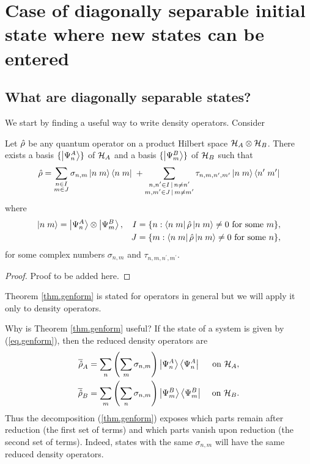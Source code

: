 \section{Case of diagonally separable initial state where new states can be entered}\label{sec.separablestate}

\subsection{What are diagonally separable states?}

We start by finding a useful way to write density operators. Consider
\begin{theorem}\label{thm.genform}
Let \(\hat{\rho}\) be any quantum operator on a product Hilbert space \(\mathcal{H}_A\otimes\mathcal{H}_B\). There exists a basis \(\{\left|\Psi_n^A\right\rangle\}\) of \(\mathcal{H}_A\) and a basis \(\{\left|\Psi_m^B\right\rangle\}\) of \(\mathcal{H}_B\) such that
\begin{equation}\label{eq.genform}
\hat{\rho} = \sum_{\substack{n\in I \\ m\in J}} \sigma_{n,m} \left|n\;m\right\rangle\left\langle n\;m\right| \;+ \sum_{\substack{n,n^\prime \in I \,|\, n \neq n^\prime \\ m,m^\prime \in J \,|\, m \neq m^\prime}} \tau_{n,m,n^\prime,m^\prime} \left|n\;m\right\rangle\left\langle n^\prime\;m^\prime\right|
\end{equation}
where
\begin{align*}
\left|n\;m\right\rangle &= \left|\Psi_n^A\right\rangle\otimes\left|\Psi_m^B\right\rangle, &
I &= \{n : \left\langle n\;m\right|\hat{\rho}\left|n\;m\right\rangle \neq 0 \text{ for some } m\}, \\
&&J &= \{m : \left\langle n\;m\right|\hat{\rho}\left|n\;m\right\rangle \neq 0 \text{ for some } n\},
\end{align*}
for some complex numbers \(\sigma_{n,m}\) and \(\tau_{n,m,n^\prime,m^\prime}\).
\end{theorem}

\begin{proof}
Proof to be added here.
\end{proof}

Theorem \ref{thm.genform} is stated for operators in general but we will apply it only to density operators.

Why is Theorem \ref{thm.genform} useful? If the state of a system is given by (\ref{eq.genform}), then the reduced density operators are
\begin{align*}
\overline{\hat{\rho}}_A &= \sum_n \left(\sum_m \sigma_{n,m}\right) \left|\Psi_n^A\right\rangle\left\langle\Psi_n^A\right| &
\text{ on } \mathcal{H}_A, \\
\overline{\hat{\rho}}_B &= \sum_m \left(\sum_n \sigma_{n,m}\right) \left|\Psi_m^B\right\rangle\left\langle\Psi_m^B\right| &
\text{ on } \mathcal{H}_B. 
\end{align*}
Thus the decomposition (\ref{thm.genform}) exposes which parts remain after reduction (the first set of terms) and which parts vanish upon reduction (the second set of terms). Indeed, states with the same \(\sigma_{n,m}\) will have the same reduced density operators.


